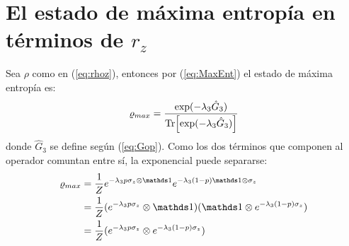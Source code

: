 \section{El estado de máxima entropía en términos de $r_{z}$}
Sea $\rho$ como en (\ref{eq:rhoz}), entonces por (\ref{eq:MaxEnt}) el estado de máxima entropía es:
\begin{equation}\label{eq:MaxEntZ}
\varrho_{max}=\frac{\text{exp}(-\lambda_{3}\hat{G}_{3})}{\Tr[\text{exp}(-\lambda_{3}\hat{G}_{3})]}
\end{equation}
donde $\hat{G}_{3}$ se define según (\ref{eq:Gop}). Como los dos términos que componen al operador comuntan entre sí, la exponencial puede separarse:
\begin{align*}
\varrho_{max}&=\frac{1}{Z}e^{-\lambda_{3}p\sigma_{z}\otimes\Id}e^{-\lambda_{3}(1-p)\Id\otimes\sigma_{z}}\\
&=\frac{1}{Z}(e^{-\lambda_{3}p\sigma_{z}}\otimes\Id)( \Id\otimes e^{-\lambda_{3}(1-p)\sigma_{z}})\\
&=\frac{1}{Z}(e^{-\lambda_{3}p\sigma_{z}}\otimes e^{-\lambda_{3}(1-p)\sigma_{z}})\\
\end{align*}

